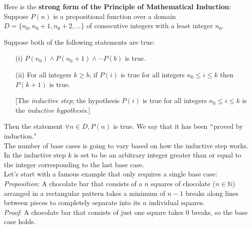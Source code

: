\documentclass[12pt]{amsart}
\theoremstyle{definition}
\theoremstyle{remark}
\newcommand{\nats}{\mathbb N}
\begin{document}
\newpage


Here is the \textbf{strong form of the Principle of Mathematical Induction}:\\

Suppose $P(n)$ is a propositional function over a domain $D=\{n_{0},n_{0}+1,n_{0}+2,...\}$ of consecutive integers with a least integer $n_{0}$.

\bigskip

Suppose both of the following statements are true:

\bigskip

\begin{enumerate}

\item[(i)]  $P(n_{0})\wedge P(n_0 +1)\wedge \cdots P(b)$ is true.


\bigskip

\item[(ii)]  For all integers $k\geq b$, if $P(i)$ is true for all integers $n_0 \leq i\leq k$ then $P(k+1)$ is true.

 \medskip

[The \emph{inductive step}; the hypothesis $P(i)$ is true for all integers $n_0 \leq i\leq k$ is the \emph{inductive hypothesis}.]\\

\end{enumerate}

Then the statement $\forall n\in D, P(n)$ is true.  We say that it has been $``$proved by induction."\\


The number of base cases is going to vary based on how the inductive step works.  In the inductive step $k$ is set to be an arbitrary integer greater than or equal to the integer corresponding to the last base case.\\

Let's start with a famous example that only requires a single base case:\\

\emph{Proposition}: A chocolate bar that consists of a $n$ squares of chocolate ($n\in\nats$) arranged in a rectangular pattern takes a minimum of $n-1$ breaks along lines between pieces to completely separate into its $n$ individual squares.\\

\emph{Proof}:  A chocolate bar that consists of just one square takes $0$ breaks, so the base case holds.\\
\end{document}

